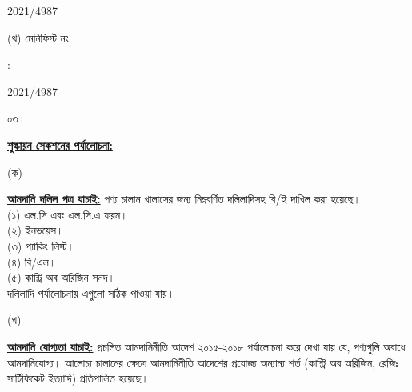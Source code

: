 \documentclass[12pt]{article}
\newcommand{\rotno}{2021/4987}
\begin{document}
\begin{minipage}[t]{0.50\linewidth}
{\rotno}
\\
\end{minipage}
\begin{minipage}[t]{0.05\linewidth}
\hspace*{1em}
\end{minipage}
\begin{minipage}[t]{0.45\linewidth}
(থ) মেনিফিস্ট নং
\end{minipage}
\begin{minipage}[t]{0.02\linewidth}
:
\end{minipage}
\begin{minipage}[t]{0.50\linewidth}
{\rotno}
\\
\end{minipage}
\normalsize
\begin{minipage}[t]{0.05\linewidth}
০৩।
\end{minipage}
\begin{minipage}[t]{0.95\linewidth}
\underline{\textbf{শুল্কায়ন সেকশনের পর্যালোচনা:}}
\end{minipage}
\begin{minipage}[t]{0.05\linewidth}
\hspace{1em}
\end{minipage}
\begin{minipage}[t]{0.05\linewidth}
(ক)
\end{minipage}
\begin{minipage}[t]{0.90\linewidth}
\underline{\textbf{আমদানি দলিল পত্র যাচাই:}}
পণ্য চালান খালাসের জন্য নিম্নবর্ণিত দলিলাদিসহ বি/ই দাখিল করা
হয়েছে।
\\
(১) এল.সি এবং এল.সি.এ ফরম।
\\
(২) ইনভয়েস।
\\
(৩) প্যাকিং লিস্ট।
\\
(৪) বি/এল।
\\
(৫) কান্ট্রি অব অরিজিন সনদ।
\\
দলিলাদি পর্যালোচনায় এগুলো
সঠিক পাওয়া যায়।
\\
\end{minipage}
\begin{minipage}[t]{0.05\linewidth}
\hspace{1em}
\end{minipage}
\begin{minipage}[t]{0.05\linewidth}
(খ)
\end{minipage}
\begin{minipage}[t]{0.90\linewidth}
\underline{\textbf{আমদানি যোগ্যতা যাচাই:}}
প্রচলিত আমদানিনীতি আদেশ ২০১৫-২০১৮  পর্যালোচনা করে দেখা যায় যে, পণ্যগুলি অবাধে আমদানিযোগ্য।
আলোচ্য চালানের ক্ষেত্রে আমদানিনীতি আদেশের প্রযোজ্য অন্যান্য শর্ত (কান্ট্রি অব অরিজিন, রেজিঃ
সার্টিফিকেট ইত্যাদি) প্রতিপালিত হয়েছে।
\\
\end{minipage}
\end{document}
